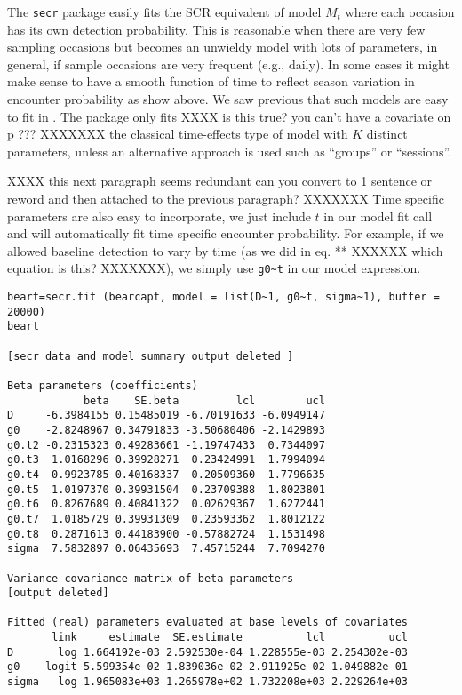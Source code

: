 The \mbox{\tt secr} package easily fits the SCR equivalent of model
$M_{t}$ where each
occasion has its own detection probability. This is reasonable when
there are very few sampling occasions but becomes an unwieldy model
with lots of parameters, in general, if sample occasions are very
frequent (e.g., daily). In some cases it might make sense to have a
smooth function of time to reflect season variation in encounter
probability as show above. We saw previous that such models are easy
to fit in \winbugs.  The package \secr only fits XXXX is this true?
you can't have a covariate on p ??? XXXXXXX the classical
time-effects type 
of model with $K$ distinct parameters, unless an alternative approach is
used such as ``groups'' or ``sessions''.

XXXX this next paragraph seems redundant can you convert to 1 sentence
or reword and then attached to the previous paragraph? XXXXXXX
Time specific parameters are also easy to incorporate, we just include
$t$ in our model fit call and \secr will automatically fit time
specific encounter probability.  For example, if we allowed baseline detection to
vary by time (as we did in eq. ** XXXXXX which equation is this?
XXXXXXX), we simply use \verb+g0~t+ in our model expression.



{\small
\begin{verbatim}
beart=secr.fit (bearcapt, model = list(D~1, g0~t, sigma~1), buffer = 20000) 
beart

[secr data and model summary output deleted ]

Beta parameters (coefficients) 
            beta    SE.beta         lcl        ucl
D     -6.3984155 0.15485019 -6.70191633 -6.0949147
g0    -2.8248967 0.34791833 -3.50680406 -2.1429893
g0.t2 -0.2315323 0.49283661 -1.19747433  0.7344097
g0.t3  1.0168296 0.39928271  0.23424991  1.7994094
g0.t4  0.9923785 0.40168337  0.20509360  1.7796635
g0.t5  1.0197370 0.39931504  0.23709388  1.8023801
g0.t6  0.8267689 0.40841322  0.02629367  1.6272441
g0.t7  1.0185729 0.39931309  0.23593362  1.8012122
g0.t8  0.2871613 0.44183900 -0.57882724  1.1531498
sigma  7.5832897 0.06435693  7.45715244  7.7094270

Variance-covariance matrix of beta parameters 
[output deleted]

Fitted (real) parameters evaluated at base levels of covariates 
       link     estimate  SE.estimate          lcl          ucl
D       log 1.664192e-03 2.592530e-04 1.228555e-03 2.254302e-03
g0    logit 5.599354e-02 1.839036e-02 2.911925e-02 1.049882e-01
sigma   log 1.965083e+03 1.265978e+02 1.732208e+03 2.229264e+03
\end{verbatim}
}

